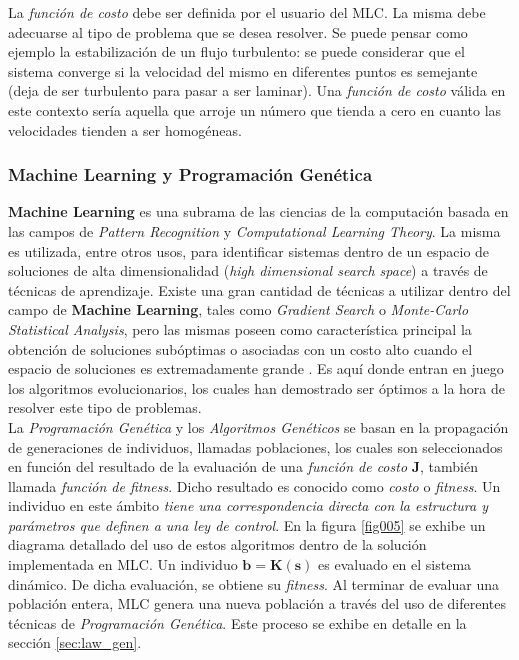 \documentclass[a4paper,10pt]{article}
\begin{document}
        \indent La \textit{función de costo} debe ser definida por el usuario del MLC. La misma debe adecuarse al tipo de problema que se 
        desea resolver. Se puede pensar como ejemplo la estabilización de un flujo turbulento: se puede considerar que el sistema converge 
        si la velocidad del mismo en diferentes puntos es semejante (deja de ser turbulento para pasar a ser laminar). Una 
        \textit{función de costo} válida en este contexto sería aquella que arroje un número que tienda a cero en cuanto las velocidades 
        tienden a ser homogéneas.
        

    \subsubsection{Machine Learning y Programación Genética} \label{sec:mlc_and_gp}
        \textbf{Machine Learning} es una subrama de las ciencias de la computación basada en las campos de \textit{Pattern Recognition} y
        \textit{Computational Learning Theory}. La misma es utilizada, entre otros usos, para identificar sistemas dentro de un espacio de
        soluciones de alta dimensionalidad (\textit{high dimensional search space}) a través de técnicas de aprendizaje. Existe una gran
        cantidad de técnicas a utilizar dentro del campo de \textbf{Machine Learning}, tales como \textit{Gradient Search} o
        \textit{Monte-Carlo Statistical Analysis}, pero las mismas poseen como característica principal la obtención de soluciones
        subóptimas o asociadas con un costo alto cuando el espacio de soluciones es extremadamente grande \cite{Duriez2016}. Es aquí
        donde entran en juego los algoritmos
        evolucionarios, los cuales han demostrado ser óptimos a la hora de resolver este tipo de problemas. \\

        \indent La \textit{Programación Genética} y los \textit{Algoritmos Genéticos} se basan en la propagación de generaciones de
        individuos, llamadas poblaciones, los cuales son seleccionados en función del resultado de la evaluación de una 
        \textit{función de costo} \textbf{J}, también llamada \textit{función de fitness}. Dicho resultado es conocido como \textit{costo}
        o \textit{fitness}. 
        Un individuo en este ámbito \textit{tiene una correspondencia directa con la estructura y parámetros que definen
        a una ley de control}. En la figura \ref{fig005} se exhibe un diagrama detallado del uso de estos algoritmos dentro de la solución
        implementada en MLC. Un individuo $\mathbf{b = K(s)}$ es evaluado en el sistema dinámico. De dicha evaluación, se obtiene su
        \textit{fitness}. Al terminar de evaluar una población entera, MLC genera una nueva población a través del uso de
        diferentes técnicas de \textit{Programación Genética}. Este proceso se exhibe en detalle en la sección \ref{sec:law_gen}. \\
\end{document}
